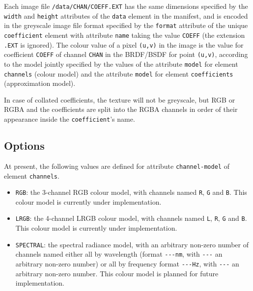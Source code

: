 Each image file \texttt{/data/CHAN/COEFF.EXT} has the same dimensions
specified by the \texttt{width} and \texttt{height} attributes of the
\texttt{data} element in the manifest, and is encoded in the greyscale
image file format specified by the \texttt{format} attribute of the
unique \texttt{coefficient} element with attribute \texttt{name} taking
the value \texttt{COEFF} (the extension \texttt{.EXT} is ignored). The
colour value of a pixel \texttt{(u,v)} in the image is the value for
coefficient \texttt{COEFF} of channel \texttt{CHAN} in the BRDF/BSDF for
point \texttt{(u,v)}, according to the model jointly specified by the
values of the attribute \texttt{model} for element \texttt{channels}
(colour model) and the attribute \texttt{model} for element
\texttt{coefficients} (approximation model).

In case of collated coefficients,
the texture will not be greyscale, but RGB or RGBA and
the coefficients are split into the RGBA channels in order of their appearance
inside the \texttt{coefficient}'s name.

\hypertarget{options}{%
\subsection{Options}\label{options}}

At present, the following values are defined for attribute
\texttt{channel-model} of element \texttt{channels}.
\begin{itemize}
\item \texttt{RGB}: the
3-channel RGB colour model, with channels named \texttt{R}, \texttt{G}
and \texttt{B}. This colour model is currently under implementation.
\item \texttt{LRGB}: the 4-channel LRGB colour model, with channels named
\texttt{L}, \texttt{R}, \texttt{G} and \texttt{B}. This colour model is
currently under implementation.
\item \texttt{SPECTRAL}: the spectral
radiance model, with an arbitrary non-zero number of channels named
either all by wavelength (format \texttt{-\/-\/-nm}, with
\texttt{-\/-\/-} an arbitrary non-zero number) or all by frequency
format \texttt{-\/-\/-Hz}, with \texttt{-\/-\/-} an arbitrary non-zero
number. This colour model is planned for future implementation.
\end{itemize}

